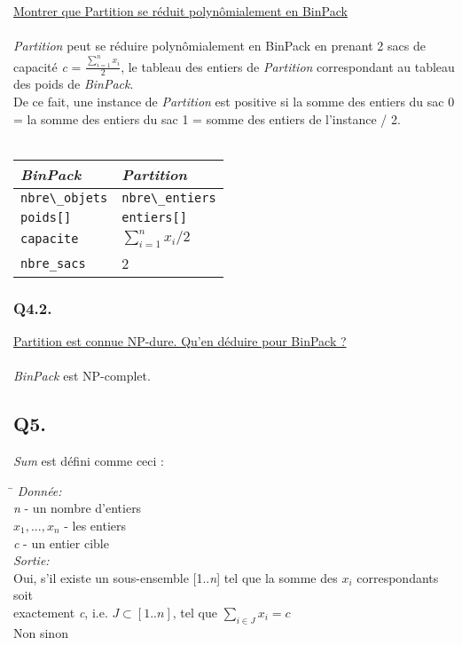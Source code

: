 \underline{Montrer que Partition se réduit polynômialement en BinPack}
~\\~\\
\textit{Partition} peut se réduire polynômialement en BinPack en prenant 2 sacs de capacité \textit{c} = $\frac{\sum\nolimits_{i = 1}^{n} x_{i}}{2}$, le  tableau des entiers de \textit{Partition} correspondant au tableau des poids de \textit{BinPack}.\\
De ce fait, une instance de \textit{Partition} est positive si la somme des entiers du sac 0 = la somme des entiers du sac 1 = somme des entiers de l'instance / 2.\\~\\
\begin{tabular}{|l|l|}
  \hline
  \textit{BinPack} & \textit{Partition}\\
  \hline
  \verb+nbre\_objets+ & \verb+nbre\_entiers+ \\
  \hline
  \verb+poids[]+ & \verb+entiers[]+ \\
  \hline
  \verb+capacite+ & \textit{$\sum\nolimits_{i = 1}^{n} x_{i} / 2$}\\
  \hline
  \verb+nbre_sacs+ & 2\\
  \hline
\end{tabular}

\subsubsection{Q4.2.}

\underline{Partition est connue NP-dure. Qu'en déduire pour BinPack ?}
~\\~\\
\textit{BinPack} est NP-complet.

\subsection*{Q5.}

\textit{Sum} est défini comme ceci :
	\begin{tabbing}
		\hspace{1cm}\=\kill
		\textit{Donnée:}\\
			\>\textit{n} - un nombre d'entiers\\
			\>\textit{$x_{1},...,x_{n}$} - les entiers\\
			\>\textit{c} - un entier cible\\
		\textit{Sortie:}\\
			\>Oui, s'il existe un sous-ensemble [1..\textit{n}] tel que la somme des $x_{i}$ correspondants soit\\
			\>exactement \textit{c}, i.e. $J \subset [1..n]$, tel que $\sum\nolimits_{i \in J} x_{i} = c$\\
			\>Non sinon
	\end{tabbing}
	
